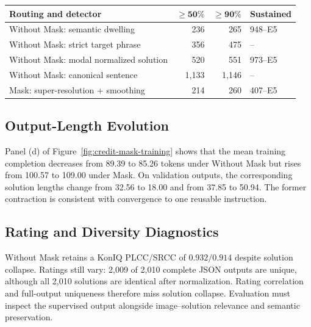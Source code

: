 \begin{center}
\begin{minipage}{\columnwidth}
\centering
{\scriptsize
\setlength{\tabcolsep}{2.5pt}
\begin{tabular}{@{}p{1.55in}rrl@{}}
\toprule
\textbf{Routing and detector}
& $\boldsymbol{\geq 50\%}$ & $\boldsymbol{\geq 90\%}$
& \textbf{Sustained} \\
\midrule
Without Mask: semantic dwelling & 236 & 265 & 948--E5 \\
Without Mask: strict target phrase & 356 & 475 & -- \\
Without Mask: modal normalized solution & 520 & 551 & 973--E5 \\
Without Mask: canonical sentence & 1,133 & 1,146 & -- \\
Mask: super-resolution + smoothing & 214 & 260 & 407--E5 \\
\bottomrule
\end{tabular}
}
\label{tab:completion-audit-milestones}
\end{minipage}
\end{center}

\subsection{Output-Length Evolution}
Panel (d) of Figure~\ref{fig:credit-mask-training} shows that the mean training
completion decreases from 89.39 to 85.26 tokens under Without Mask but rises
from 100.57 to 109.00 under Mask. On validation outputs, the corresponding
solution lengths change from 32.56 to 18.00 and from 37.85 to 50.94. The former
contraction is consistent with convergence to one reusable instruction.

\subsection{Rating and Diversity Diagnostics}
Without Mask retains a KonIQ PLCC/SRCC of $0.932/0.914$ despite solution
collapse. Ratings still vary: 2,009 of 2,010 complete JSON outputs are unique,
although all 2,010 solutions are identical after normalization. Rating
correlation and full-output uniqueness therefore miss solution collapse.
Evaluation must inspect the supervised output alongside image--solution
relevance and semantic preservation.

